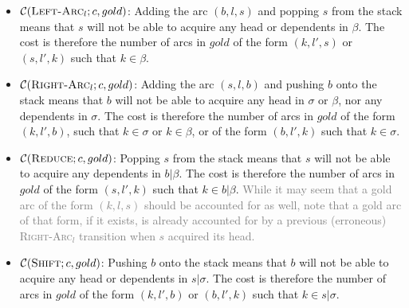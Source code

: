 \documentclass[11pt,letterpaper]{article}
\newcommand{\maybe}[1]{\textcolor{gray}{#1}}
\begin{document}
\begin{itemize}
   \item $\mathcal{C}(\textsc{Left-Arc}_l; c, gold)$: 
Adding the arc $(b, l, s)$ and popping $s$ from the stack means that $s$ will not be able
to acquire any head or dependents in $\beta$. The cost is therefore the number of arcs 
in $gold$ of the form $(k, l', s)$ or $(s, l', k)$ such that $k \in \beta$.

\item $\mathcal{C}(\textsc{Right-Arc}_l; c, gold)$: 
Adding the arc $(s, l, b)$ and pushing $b$ onto the stack means that $b$ will 
not be able to acquire any head in $\sigma$ or $\beta$, nor any dependents in $\sigma$. 
The cost is therefore the number of arcs in $gold$ of the form $(k, l', b)$,
such that $k \in \sigma$ or $k \in \beta$, 
or of the form $(b, l', k)$ such that $k \in \sigma$. 

\item $\mathcal{C}(\textsc{Reduce}; c, gold)$: 
Popping $s$ from the stack means that $s$ will not be able to acquire any dependents
in $b|\beta$. The cost is therefore the number of arcs in $gold$ of the form $(s, l', k)$
such that $k \in b|\beta$. \maybe{While it may seem that a gold arc of the form $(k, l, s)$ should be accounted for as well,
note that a gold arc of that form, if it exists, is already accounted for by a previous (erroneous) \textsc{Right-Arc}$_l$ 
transition when $s$ acquired its head.}

\item $\mathcal{C}(\textsc{Shift}; c, gold)$: 
Pushing $b$ onto the stack means that $b$ will not be able to acquire any head
or dependents in $s|\sigma$. The cost is therefore the number of arcs in $gold$ of 
the form $(k, l', b)$ or $(b, l', k)$ such that $k \in s|\sigma$. 
\end{itemize}


\end{document}
